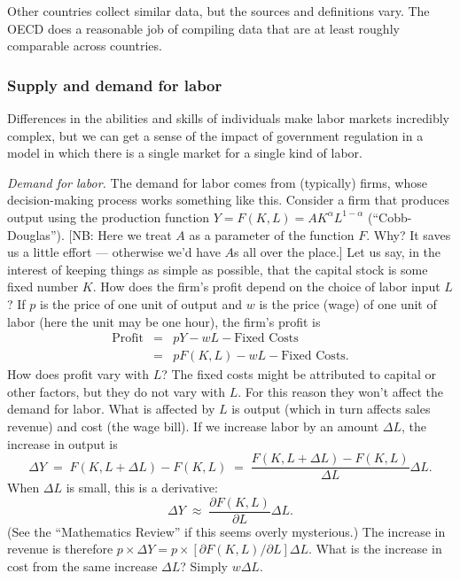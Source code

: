 \documentclass[letterpaper,12pt]{article}
\begin{document}
Other countries collect similar data, but the sources and definitions vary.
The OECD does a reasonable job of compiling data that are 
at least roughly comparable across countries.  


\subsubsection*{Supply and demand for labor}

Differences in the abilities and skills of individuals 
make labor markets incredibly complex, 
but we can get a sense of the impact of government regulation
in a model in which there is a single market for a single kind of labor.  

{\it Demand for labor.\/}
The demand for labor comes from (typically) firms, 
whose decision-making process works something like this.  
Consider a firm that produces output using the production function
$Y=F(K,L)=AK^{\alpha}L^{1-\alpha}$ (``Cobb-Douglas'').
[NB:  Here we treat $A$ as a parameter of the function $F$.
Why?  It saves us a little effort --- 
otherwise we'd have $A$s all over the place.]
Let us say,
in the interest of keeping things as simple as possible, that the
capital stock is some fixed number $K$. How does the firm's profit
depend on the choice of labor input $L$? If $p$ is the price of
one unit of output and $w$ is the price (wage) of one unit of
labor (here the unit may be one hour), the firm's profit is
%
\begin{eqnarray*}
    \mbox{Profit} &=& p Y - w L - \mbox{Fixed Costs} \\
                  &=& p F(K,L) - w L - \mbox{Fixed Costs} .
\end{eqnarray*}
%
How does profit vary with $L$? The fixed costs might be attributed
to capital or other factors, but they do not vary with $L$.
For this reason they won't affect the demand for labor.  What is
affected by $L$ is output (which in turn affects sales revenue)
and cost (the wage bill). If we increase labor by an amount
$\Delta L$, the increase in output is
%
\[
    \Delta Y  \;=\; F(K,L+\Delta L)-F(K,L)
        \;=\; \frac{F(K,L+\Delta L)-F(K,L)}{\Delta L}\Delta L.
\]
%
When $\Delta L$ is small, this is a derivative:
%
\begin{equation*}
    \Delta Y  \;\approx\; \frac{\partial F(K,L)}{\partial L}\Delta L.
\end{equation*}
%
(See the ``Mathematics Review'' if this seems overly mysterious.)
The increase in revenue is therefore $p\times \Delta Y = p \times
[\partial F(K,L)/\partial L] \Delta L$. What is the increase in
cost from the same increase $\Delta L$? Simply $w\Delta L$.
\end{document}
